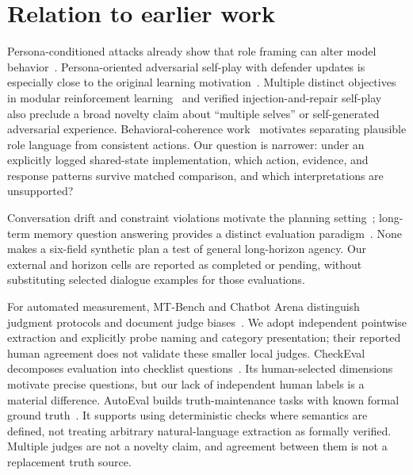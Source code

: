 \section{Relation to earlier work}
Persona-conditioned attacks already show that role framing can alter model behavior~\cite{collu2026}. Persona-oriented adversarial self-play with defender updates is especially close to the original learning motivation~\cite{li2026}. Multiple distinct objectives in modular reinforcement learning~\cite{dulberg2023} and verified injection-and-repair self-play~\cite{wei2026} also preclude a broad novelty claim about ``multiple selves'' or self-generated adversarial experience. Behavioral-coherence work~\cite{mooney2026} motivates separating plausible role language from consistent actions. Our question is narrower: under an explicitly logged shared-state implementation, which action, evidence, and response patterns survive matched comparison, and which interpretations are unsupported?

Conversation drift and constraint violations motivate the planning setting~\cite{laban2025,kruthof2026}; long-term memory question answering provides a distinct evaluation paradigm~\cite{wu2025}. None makes a six-field synthetic plan a test of general long-horizon agency. Our external and horizon cells are reported as completed or pending, without substituting selected dialogue examples for those evaluations.

For automated measurement, MT-Bench and Chatbot Arena distinguish judgment protocols and document judge biases~\cite{zheng2023}. We adopt independent pointwise extraction and explicitly probe naming and category presentation; their reported human agreement does not validate these smaller local judges. CheckEval decomposes evaluation into checklist questions~\cite{lee2025}. Its human-selected dimensions motivate precise questions, but our lack of independent human labels is a material difference. AutoEval builds truth-maintenance tasks with known formal ground truth~\cite{karia2025}. It supports using deterministic checks where semantics are defined, not treating arbitrary natural-language extraction as formally verified. Multiple judges are not a novelty claim, and agreement between them is not a replacement truth source.
